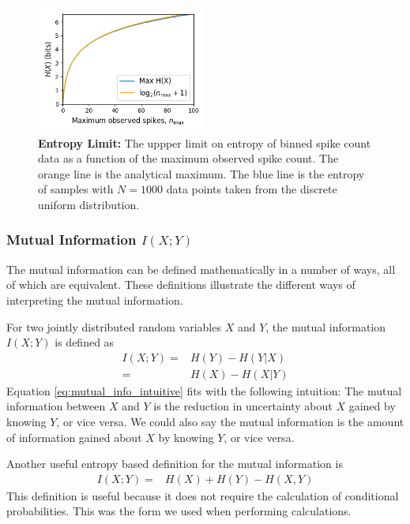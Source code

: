 \documentclass[a4paper,12pt]{article}
\theoremstyle{definition}
\begin{document}
        \begin{figure}[h]
          \centering
          \includegraphics[width=0.5\textwidth]{figures/entropy_limit.png}
          \caption{\textbf{Entropy Limit:} The uppper limit on entropy of binned spike count data as a function of the maximum observed spike count. The orange line is the analytical maximum. The blue line is the entropy of samples with $N=1000$ data points taken from the discrete uniform distribution.}
          \label{fig:entropy_limit}
        \end{figure}

        \subsubsection{Mutual Information $I(X;Y)$}
        The mutual information can be defined mathematically in a number of ways, all of which are equivalent. These definitions illustrate the different ways of interpreting the mutual information.

        For two jointly distributed random variables $X$ and $Y$, the mutual information $I(X;Y)$ is defined as
        \begin{align}\label{eq:mutual_info_intuitive}
        I(X;Y)  =& H(Y) - H(Y|X) \\
                =& H(X) - H(X|Y)
        \end{align}
        Equation \ref{eq:mutual_info_intuitive} fits with the following intuition: The mutual information between $X$ and $Y$ is the reduction in uncertainty about $X$ gained by knowing $Y$, or vice versa. We could also say the mutual information is the amount of information gained about $X$ by knowing $Y$, or vice versa.

        Another useful entropy based definition for the mutual information is
        \begin{align}\label{eq:mutual_info_useful}
        I(X;Y)  =& H(X) + H(Y) - H(X,Y)
        \end{align}
        This definition is useful because it does not require the calculation of conditional probabilities. This was the form we used when performing calculations.
\end{document}
